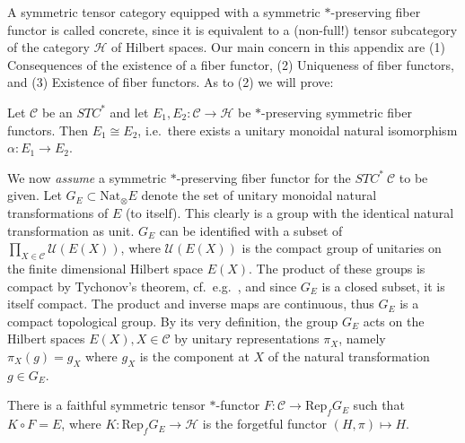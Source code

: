 \documentclass[11pt]{article}
\theoremstyle{definition}
\theoremstyle{definition}
\theoremstyle{remark}
\def\2#1{{\mathcal #1}}
\newcommand{\Rep}{\mathrm{Rep}}
\newcommand{\rarr}{\rightarrow}
\newcommand{\Nat}{\mathrm{Nat}}
\begin{document}
A symmetric tensor category equipped with a symmetric $*$-preserving fiber functor is called
concrete, since it is equivalent to a (non-full!) tensor subcategory of the category $\2H$ of
Hilbert spaces. Our main concern in this appendix  are (1) Consequences of the existence of a fiber
functor, (2) Uniqueness of fiber functors, and (3) Existence of fiber functors. As to (2) we will prove:

\btheor \label{theor-uniq1} 
Let $\2C$ be an $STC^*$ and let $E_1,E_2:\2C\rarr\2H$ be $*$-preserving symmetric fiber
functors. Then $E_1\cong E_2$, i.e.\ there exists a unitary monoidal natural isomorphism  
$\alpha: E_1\rarr E_2$.
\etheor

We now {\it assume} a symmetric $*$-preserving fiber functor for the $STC^*\ \2C$ to be given. Let
$G_E\subset\Nat_\otimes E$ denote the set of unitary monoidal natural transformations of $E$ (to 
itself). This clearly is a group with the identical natural transformation as unit. $G_E$ can be
identified with a subset of $\prod_{X\in\2C}\2U(E(X))$, where $\2U(E(X))$ is the compact group of
unitaries on the finite dimensional Hilbert space $E(X)$. The product of these groups is compact by
Tychonov's theorem, cf.\ e.g.\ \cite[Theorem 1.6.10]{ped}, and since $G_E$ is a closed subset, it is
itself compact. The product and inverse maps are continuous, thus $G_E$ is a compact topological
group. By its very definition, the group $G_E$ acts on the Hilbert spaces $E(X), X\in\2C$ by unitary
representations $\pi_X$, namely $\pi_X(g)=g_X$ where $g_X$ is the component at $X$ of the natural
transformation $g\in G_E$.  

\bprop
There is a faithful symmetric tensor $*$-functor $F: \2C\rarr\Rep_fG_E$ such that $K\circ F=E$,
where $K:\Rep_fG_E \rarr\2H$ is the forgetful functor $(H,\pi)\mapsto H$.
\eprop 
\end{document}
